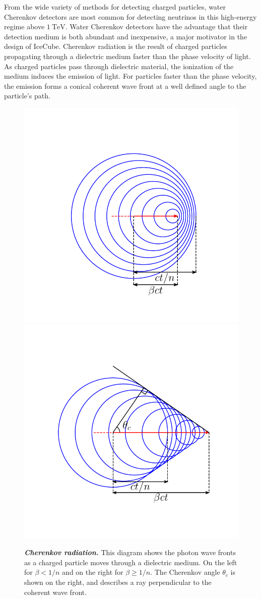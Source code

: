 From the wide variety of methods for detecting charged particles, water Cherenkov detectors are most common for detecting neutrinos in this high-energy regime above $\SI{1}\TeV$.
Water Cherenkov detectors have the advantage that their detection medium is both abundant and inexpensive, a major motivator in the design of IceCube.
Cherenkov radiation is the result of charged particles propagating through a dielectric medium faster than the phase velocity of light.
As charged particles pass through dielectric material, the ionization of the medium induces the emission of light.
For particles faster than the phase velocity, the emission forms a conical coherent wave front at a well defined angle to the particle's path.

\begin{figure}
	\centering
	\includegraphics[width=0.45\linewidth]{figures/no_cherenkov}
	\includegraphics[width=0.45\linewidth]{figures/cherenkov}
	\internallinenumbers
	\caption{\textbf{\textit{Cherenkov radiation.}}
		This diagram shows the photon wave fronts as a charged particle moves through a dielectric medium.
		On the left for $\beta < 1/n$ and on the right for $\beta \geq 1/n$.
		The Cherenkov angle $\theta_c$ is shown on the right, and describes a ray perpendicular to the coherent wave front.
	}\label{fig:cherenkov}
\end{figure}


